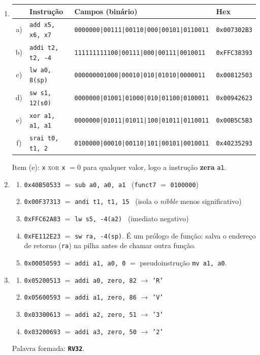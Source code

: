 \documentclass[11pt, a4paper]{article}
\begin{document}
\begin{enumerate}
\item \begin{center}
\small
\begin{tabular}{clll}
\toprule
& \textbf{Instru\c{c}\~{a}o} & \textbf{Campos (bin\'{a}rio)} & \textbf{Hex}\\
\midrule
a) & \texttt{add x5, x6, x7}  & \texttt{0000000|00111|00110|000|00101|0110011} & \texttt{0x007302B3}\\
b) & \texttt{addi t2, t2, -4} & \texttt{111111111100|00111|000|00111|0010011} & \texttt{0xFFC38393}\\
c) & \texttt{lw a0, 8(sp)}    & \texttt{000000001000|00010|010|01010|0000011} & \texttt{0x00812503}\\
d) & \texttt{sw s1, 12(s0)}   & \texttt{0000000|01001|01000|010|01100|0100011} & \texttt{0x00942623}\\
e) & \texttt{xor a1, a1, a1}  & \texttt{0000000|01011|01011|100|01011|0110011} & \texttt{0x00B5C5B3}\\
f) & \texttt{srai t0, t1, 2}  & \texttt{0100000|00010|00110|101|00101|0010011} & \texttt{0x40235293}\\
\bottomrule
\end{tabular}
\end{center}

Item (e): \texttt{x} \textsc{xor} \texttt{x} $= 0$ para qualquer valor, logo a instru\c{c}\~{a}o \textbf{zera} \texttt{a1}.

\item \begin{enumerate}
  \item \texttt{0x40B50533} $=$ \texttt{sub a0, a0, a1} \ (\texttt{funct7} $=$ \texttt{0100000})
  \item \texttt{0x00F37313} $=$ \texttt{andi t1, t1, 15} \ (isola o \emph{nibble} menos significativo)
  \item \texttt{0xFFC62A83} $=$ \texttt{lw s5, -4(a2)} \ (imediato negativo)
  \item \texttt{0xFE112E23} $=$ \texttt{sw ra, -4(sp)}. \'{E} um pr\'{o}logo de fun\c{c}\~{a}o: salva o endere\c{c}o de retorno (\texttt{ra}) na pilha antes de chamar outra fun\c{c}\~{a}o.
  \item \texttt{0x00050593} $=$ \texttt{addi a1, a0, 0} $=$ pseudoinstru\c{c}\~{a}o \texttt{mv a1, a0}.
\end{enumerate}

\item \begin{enumerate}
  \item \texttt{0x05200513} $=$ \texttt{addi a0, zero, 82} $\rightarrow$ \texttt{'R'}
  \item \texttt{0x05600593} $=$ \texttt{addi a1, zero, 86} $\rightarrow$ \texttt{'V'}
  \item \texttt{0x03300613} $=$ \texttt{addi a2, zero, 51} $\rightarrow$ \texttt{'3'}
  \item \texttt{0x03200693} $=$ \texttt{addi a3, zero, 50} $\rightarrow$ \texttt{'2'}
\end{enumerate}
Palavra formada: \textbf{\texttt{RV32}}.


\end{enumerate}
\end{document}
